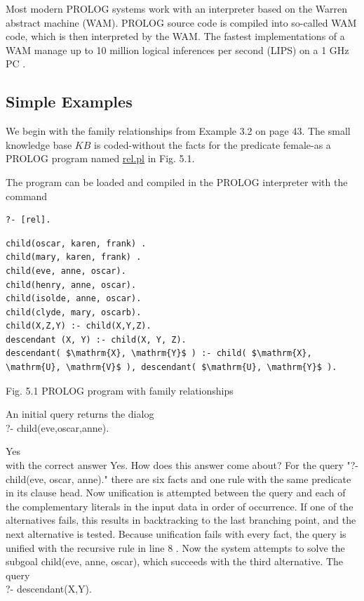 \documentclass[10pt]{article}
\begin{document}
Most modern PROLOG systems work with an interpreter based on the Warren abstract machine (WAM). PROLOG source code is compiled into so-called WAM code, which is then interpreted by the WAM. The fastest implementations of a WAM manage up to 10 million logical inferences per second (LIPS) on a 1 GHz PC .

\subsection*{Simple Examples}
We begin with the family relationships from Example 3.2 on page 43. The small knowledge base $K B$ is coded-without the facts for the predicate female-as a PROLOG program named \href{http://rel.pl}{rel.pl} in Fig. 5.1.

The program can be loaded and compiled in the PROLOG interpreter with the command

\begin{verbatim}
?- [rel].
\end{verbatim}

\begin{verbatim}
child(oscar, karen, frank) .
child(mary, karen, frank) .
child(eve, anne, oscar).
child(henry, anne, oscar).
child(isolde, anne, oscar).
child(clyde, mary, oscarb).
child(X,Z,Y) :- child(X,Y,Z).
descendant (X, Y) :- child(X, Y, Z).
descendant( $\mathrm{X}, \mathrm{Y}$ ) :- child( $\mathrm{X}, \mathrm{U}, \mathrm{V}$ ), descendant( $\mathrm{U}, \mathrm{Y}$ ).
\end{verbatim}

Fig. 5.1 PROLOG program with family relationships

An initial query returns the dialog\\
?- child(eve,oscar,anne).

Yes\\
with the correct answer Yes. How does this answer come about? For the query "?- child(eve, oscar, anne)." there are six facts and one rule with the same predicate in its clause head. Now unification is attempted between the query and each of the complementary literals in the input data in order of occurrence. If one of the alternatives fails, this results in backtracking to the last branching point, and the next alternative is tested. Because unification fails with every fact, the query is unified with the recursive rule in line 8 . Now the system attempts to solve the subgoal child(eve, anne, oscar), which succeeds with the third alternative. The query\\
?- descendant(X,Y).
\end{document}
